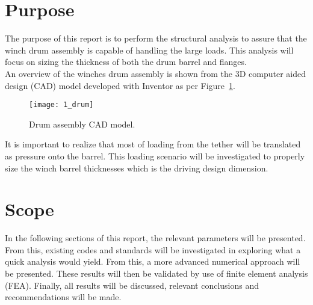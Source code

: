 \section{Purpose}

The purpose of this report is to perform the structural analysis to assure that the winch drum assembly is capable of handling the large loads. This analysis will focus on sizing the thickness of both the drum barrel and flanges.\\

An overview of the winches drum assembly is shown from the 3D computer aided design (CAD) model developed with Inventor \cite{INVENTOR} as per Figure~\ref{fig:1_drum}.
\begin{figure}[H]
	\centering
	\texttt{[image: 1\_drum]}
	\caption{Drum assembly CAD model.}
	\label{fig:1_drum}
\end{figure}

It is important to realize that most of loading from the tether will be translated as pressure onto the barrel. This loading scenario will be investigated to properly size the winch barrel thicknesses which is the driving design dimension.

\section{Scope}

In the following sections of this report, the relevant parameters will be presented. From this, existing codes and standards will be investigated in exploring what a quick analysis would yield. From this, a more advanced numerical approach will be presented. These results will then be validated by use of finite element analysis (FEA). Finally, all results will be discussed, relevant conclusions and recommendations will be made.